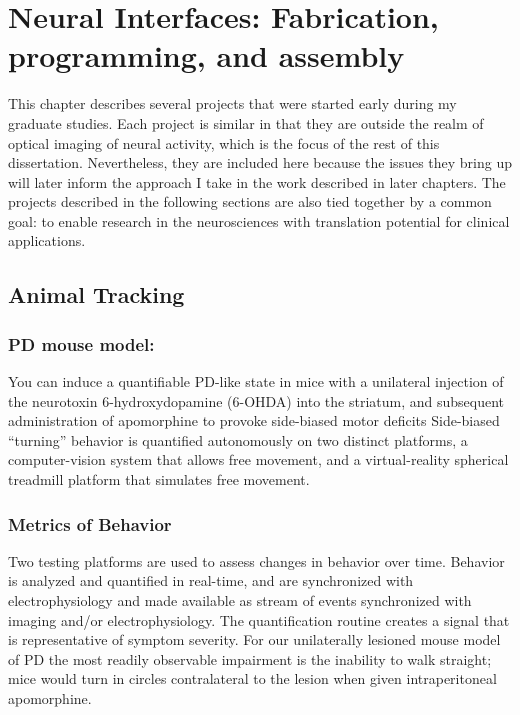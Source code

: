 % 

\thispagestyle{myheadings}

\chapter{Neural Interfaces: Fabrication, programming, and assembly}
\label{sec:neural-interfaces}

This chapter describes several projects that were started early during my graduate studies.
Each project is similar in that they are outside the realm of optical imaging of neural activity, which is the focus of the rest of this dissertation.
Nevertheless, they are included here because the issues they bring up will later inform the approach I take in the work described in later chapters.
The projects described in the following sections are also tied together by a common goal: to enable research in the neurosciences with translation potential for clinical applications.

\section{Animal Tracking}\label{sec:animal-tracking}

\subsection{PD mouse model:}\label{sec:pd-mouse-model}

You can induce a quantifiable PD-like state in mice with a unilateral injection of the neurotoxin 6-hydroxydopamine (6-OHDA) into the striatum, and subsequent administration of apomorphine to provoke side-biased motor deficits \cite{Iancu_2005}
Side-biased ``turning'' behavior is quantified autonomously on two distinct platforms, a computer-vision system that allows free movement, and a virtual-reality spherical treadmill platform that simulates free movement.

\subsection{Metrics of Behavior}\label{sec:metrics-of-behavior}

Two testing platforms are used to assess changes in behavior over time.
Behavior is analyzed and quantified in real-time, and are synchronized with electrophysiology and made available as stream of events synchronized with imaging and/or electrophysiology.
The quantification routine creates a signal that is representative of symptom severity.
For our unilaterally lesioned mouse model of PD the most readily observable impairment is the inability to walk straight;
mice would turn in circles
contralateral to the lesion when given intraperitoneal apomorphine.

